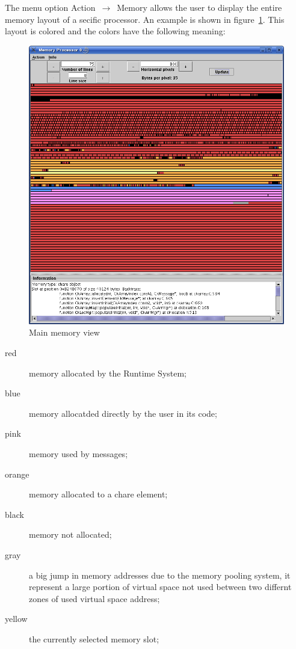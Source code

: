The menu option Action~$\rightarrow$~Memory allows the user to display the
entire memory layout of a secific processor. An example is shown in
figure~\ref{fig:memory}. This layout is colored and the colors have the
following meaning:

\begin{figure}[ht!]
\centering
\includegraphics[scale=0.5]{figs/memoryView}
\caption{Main memory view}
\label{fig:memory}
\end{figure}

\begin{description}

\item[red] memory allocated by the \charmpp{} Runtime System;

\item[blue] memory allocatded directly by the user in its code;

\item[pink] memory used by messages;

\item[orange] memory allocated to a chare element;

\item[black] memory not allocated;

\item[gray] a big jump in memory addresses due to the memory pooling system, it represent a large portion of virtual space not used between two differnt zones of used virtual space address;

\item[yellow] the currently selected memory slot;

\end{description}

